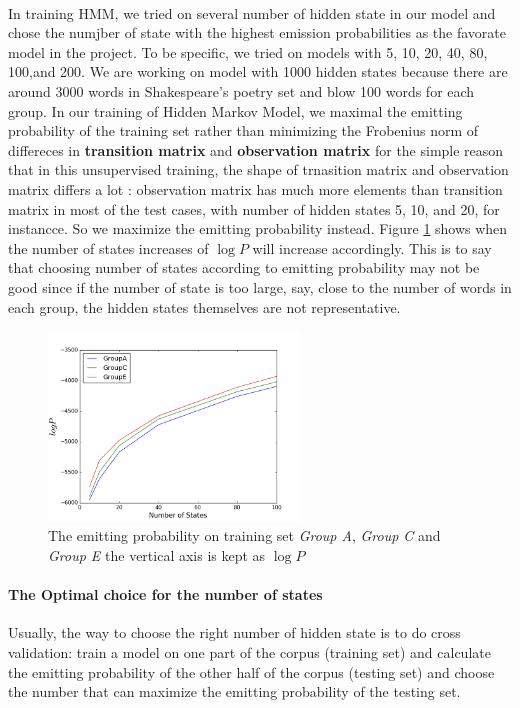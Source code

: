 %
\paragraph{}
In training HMM, we tried on several number of hidden state in our model and chose the numjber of state with the highest emission probabilities as the favorate model in the project. To be specific, we tried on models with 5, 10, 20, 40, 80, 100,and 200. We are working on model with 1000 hidden states because there are around 3000 words in Shakespeare's poetry set and blow 100 words for each group. In our training of Hidden Markov Model,  we maximal the emitting probability of the training set rather than minimizing the Frobenius norm of differeces in \textbf{transition matrix} and \textbf{observation matrix} for the simple reason that in this unsupervised training, the shape of trnasition matrix and observation matrix differs a lot : observation matrix has much more elements than transition matrix in most of the test cases, with number of hidden states 5, 10, and 20, for
instancce. So we maximize the emitting probability instead. Figure \ref{fig:probability} shows when the number of states increases of $\log P$ will increase accordingly. This is to say that choosing number of states according to emitting probability may not be good since if the number of state is too large, say, close to the number of words in each group, the hidden states themselves are not representative.
 \begin{figure}[h!]
 \centering
 \includegraphics[width=0.6\textwidth]{./figure/probability.png}
 \caption{The emitting probability on training set \textit{Group A}, \textit{Group C} and \textit{Group E} the vertical axis is kept as $\log P$\label{fig:probability}}
 \end{figure}
\paragraph{The Optimal choice for the number of states} Usually, the way to choose the right number of hidden state is to do cross validation: train a model on one part of the corpus (training set) and calculate the emitting probability of the other half of the corpus (testing set) and choose the number that can maximize the emitting probability of the testing set.

